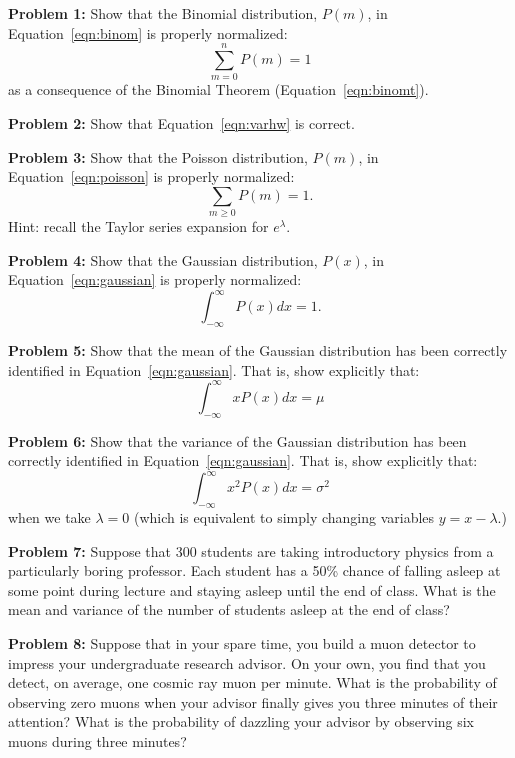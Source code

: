 \documentclass[12pt,oneside]{book}
\begin{document}
\noindent
{\bf Problem 1:} Show that the Binomial distribution, $P(m)$, in Equation~\ref{eqn:binom} is properly normalized:
\begin{displaymath}
\sum_{m=0}^n P(m) = 1
\end{displaymath}
as a consequence of the Binomial Theorem (Equation~\ref{eqn:binomt}).

\vskip 1cm
\noindent
{\bf Problem 2:} Show that Equation~\ref{eqn:varhw} is correct.

\vskip 1cm
\noindent
{\bf Problem 3:} Show that the Poisson distribution, $P(m)$, in Equation~\ref{eqn:poisson} is properly normalized:
\begin{displaymath}
\sum_{m \geq 0} P(m) = 1.
\end{displaymath}
Hint: recall the Taylor series expansion for $e^\lambda$.

\vskip 1cm
\noindent
{\bf Problem 4:} Show that the Gaussian distribution, $P(x)$, in Equation~\ref{eqn:gaussian} is properly normalized:
\begin{displaymath}
\int_{-\infty}^{\infty} P(x) dx = 1.
\end{displaymath}

\vskip 1cm
\noindent
{\bf Problem 5:} Show that the mean of the Gaussian distribution has been correctly identified in Equation~\ref{eqn:gaussian}.  That is, show explicitly that:
\begin{displaymath}
\int_{-\infty}^{\infty} x P(x) dx = \mu 
\end{displaymath}

\vskip 1cm
\noindent
{\bf Problem 6:} Show that the variance of the Gaussian distribution has been correctly identified in Equation~\ref{eqn:gaussian}.  That is, show explicitly that:
\begin{displaymath}
\int_{-\infty}^{\infty} x^2 P(x) dx = \sigma^2 
\end{displaymath}
when we take $\lambda=0$ (which is equivalent to simply changing variables $y=x-\lambda$.)

\vskip 1cm
\noindent
{\bf Problem 7:}
Suppose that 300 students are taking introductory physics from a particularly boring professor.  Each student has a 50\% chance of falling asleep at some point during lecture and staying asleep until the end of class.  What is the mean and variance of the number of students asleep at the end of class?

\vskip 1cm
\noindent
{\bf Problem 8:}
Suppose that in your spare time, you build a muon detector to impress your undergraduate research advisor.  On your own, you find that you detect, on average, one cosmic ray muon per minute.  What is the probability of observing zero muons when your advisor finally gives you three minutes of their attention?  What is the probability of dazzling your advisor by observing six muons during three minutes?
\end{document}
